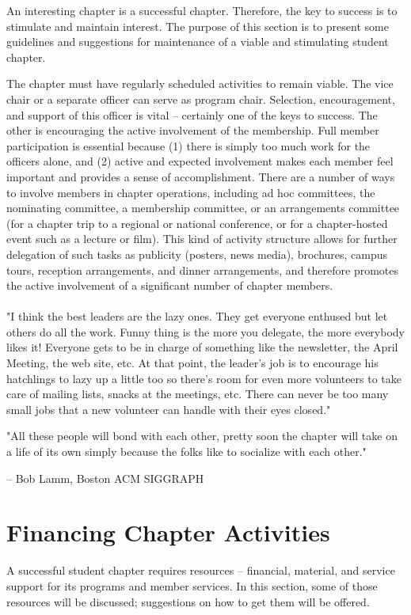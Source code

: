 An interesting chapter is a successful chapter. Therefore, the key to success is to stimulate and maintain interest. The purpose of this section is to present some guidelines and suggestions for maintenance of a viable and stimulating student chapter.

The chapter must have regularly scheduled activities to remain viable. The vice chair or a separate officer can serve as program chair. Selection, encouragement, and support of this officer is vital -- certainly one of the keys to success. The other is encouraging the active involvement of the membership. Full member participation is essential because (1) there is simply too much work for the officers alone, and (2) active and expected involvement makes each member feel important and provides a sense of accomplishment. There are a number of ways to involve members in chapter operations, including ad hoc committees, the nominating committee, a membership committee, or an arrangements committee (for a chapter trip to a regional or national conference, or for a chapter-hosted event such as a lecture or film). This kind of activity structure allows for further delegation of such tasks as publicity (posters, news media), brochures, campus tours, reception arrangements, and dinner arrangements, and therefore promotes the active involvement of a significant number of chapter members.
\\
\\
"I think the best leaders are the lazy ones. They get everyone enthused but let others do all the work. Funny thing is the more you delegate, the more everybody likes it! Everyone gets to be in charge of something like the newsletter, the April Meeting, the web site, etc. At that point, the leader's job is to encourage his hatchlings to lazy up a little too so there's room for even more volunteers to take care of mailing lists, snacks at the meetings, etc. There can never be too many small jobs that a new volunteer can handle with their eyes closed."

"All these people will bond with each other, pretty soon the chapter will take on a life of its own simply because the folks like to socialize with each other."

-- Bob Lamm, Boston ACM SIGGRAPH

\section{Financing Chapter Activities}
\label{sec:sec07}
A successful student chapter requires resources -- financial, material, and service support for its programs and member services. In this section, some of those resources will be discussed; suggestions on how to get them will be offered.


